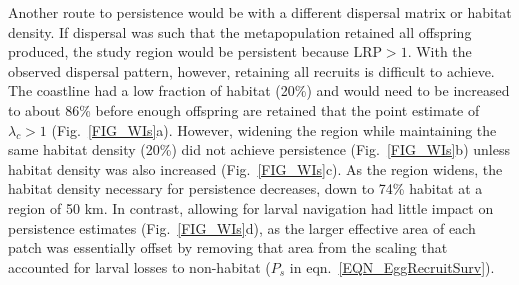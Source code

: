 \documentclass[12pt, oneside]{article}   	%
\begin{document}
Another route to persistence would be with a different dispersal matrix or habitat density. If dispersal was such that the metapopulation retained all offspring produced, the study region would be persistent because $\text{LRP} > 1$. With the observed dispersal pattern, however, retaining all recruits is difficult to achieve. The coastline had a low fraction of habitat (20\%) and would need to be increased to about 86\% before enough offspring are retained that the point estimate of $\lambda_c > 1$ (Fig.\ \ref{FIG_WIs}a). However, widening the region while maintaining the same habitat density (20\%) did not achieve persistence (Fig.\ \ref{FIG_WIs}b) unless habitat density was also increased (Fig.\ \ref{FIG_WIs}c). As the region widens, the habitat density necessary for persistence decreases, down to 74\% habitat at a region of 50 km. In contrast, allowing for larval navigation had little impact on persistence estimates (Fig.\ \ref{FIG_WIs}d), as the larger effective area of each patch was essentially offset by removing that area from the scaling that accounted for larval losses to non-habitat ($P_s$ in eqn.\ \ref{EQN_EggRecruitSurv}).

\end{document}
